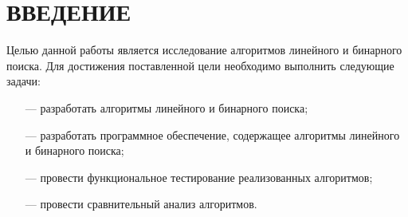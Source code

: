 \chapter*{\hfill{\centering \MakeUppercase{Введение}}\hfill} %

Целью данной работы является исследование алгоритмов линейного и бинарного поиска.
Для достижения поставленной цели необходимо выполнить следующие задачи:
\begin{itemize}
    \item[---] разработать алгоритмы линейного и бинарного поиска;
    \item[---] разработать программное обеспечение, содержащее алгоритмы линейного и бинарного поиска;
    \item[---] провести функциональное тестирование реализованных алгоритмов;
    \item[---] провести сравнительный анализ алгоритмов.
\end{itemize}

